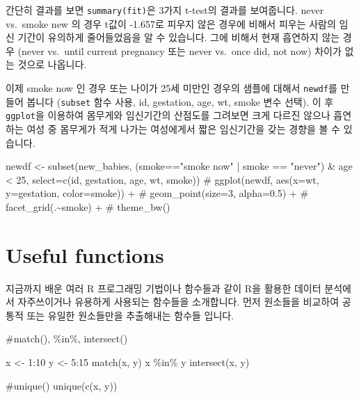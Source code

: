 \documentclass[
  a4paper,
]{book}
\newenvironment{Shaded}{\begin{snugshade}}{\end{snugshade}}
\newcommand{\AttributeTok}[1]{\textcolor[rgb]{0.40,0.45,0.13}{#1}}
\newcommand{\CommentTok}[1]{\textcolor[rgb]{0.37,0.37,0.37}{#1}}
\newcommand{\DecValTok}[1]{\textcolor[rgb]{0.68,0.00,0.00}{#1}}
\newcommand{\FunctionTok}[1]{\textcolor[rgb]{0.28,0.35,0.67}{#1}}
\newcommand{\NormalTok}[1]{\textcolor[rgb]{0.00,0.23,0.31}{#1}}
\newcommand{\OtherTok}[1]{\textcolor[rgb]{0.00,0.23,0.31}{#1}}
\newcommand{\SpecialCharTok}[1]{\textcolor[rgb]{0.37,0.37,0.37}{#1}}
\newcommand{\StringTok}[1]{\textcolor[rgb]{0.13,0.47,0.30}{#1}}
\begin{document}
간단히 결과를 보면 \texttt{summary(fit)}은 3가지 t-test의 결과를
보여줍니다. never vs.~smoke new 의 경우 t값이 -1.657로 피우지 않은
경우에 비해서 피우는 사람의 임신 기간이 유의하게 줄어들었음을 알 수
있습니다. 그에 비해서 현재 흡연하지 않는 경우 (never vs.~until current
pregnancy 또는 never vs.~once did, not now) 차이가 없는 것으로 나옵니다.

이제 smoke now 인 경우 또는 나이가 25세 미만인 경우의 샘플에 대해서
\texttt{newdf}를 만들어 봅니다 (\texttt{subset} 함수 사용, id,
gestation, age, wt, smoke 변수 선택). 이 후 \texttt{ggplot}을 이용하여
몸무게와 임신기간의 산점도를 그려보면 크게 다르진 않으나 흡연하는 여성
중 몸무게가 적게 나가는 여성에게서 짧은 임신기간을 갖는 경향을 볼 수
있습니다.

\begin{Shaded}
\begin{Highlighting}[]
\NormalTok{newdf }\OtherTok{\textless{}{-}} \FunctionTok{subset}\NormalTok{(new\_babies, (smoke}\SpecialCharTok{==}\StringTok{"smoke now"} \SpecialCharTok{|}\NormalTok{ smoke }\SpecialCharTok{==} \StringTok{"never"}\NormalTok{) }\SpecialCharTok{\&}\NormalTok{ age }\SpecialCharTok{\textless{}} \DecValTok{25}\NormalTok{, }\AttributeTok{select=}\FunctionTok{c}\NormalTok{(id, gestation, age, wt, smoke))}
\CommentTok{\# ggplot(newdf, aes(x=wt, y=gestation, color=smoke)) +}
\CommentTok{\#   geom\_point(size=3, alpha=0.5) +}
\CommentTok{\#   facet\_grid(.\textasciitilde{}smoke) + }
\CommentTok{\#   theme\_bw()}
\end{Highlighting}
\end{Shaded}

\hypertarget{useful-functions-1}{%
\section{Useful functions}\label{useful-functions-1}}

지금까지 배운 여러 R 프로그래밍 기법이나 함수들과 같이 R을 활용한 데이터
분석에서 자주쓰이거나 유용하게 사용되는 함수들을 소개합니다. 먼저
원소들을 비교하여 공통적 또는 유일한 원소들만을 추출해내는 함수들
입니다.

\begin{Shaded}
\begin{Highlighting}[]
\CommentTok{\#match(), \%in\%, intersect()}

\NormalTok{x }\OtherTok{\textless{}{-}} \DecValTok{1}\SpecialCharTok{:}\DecValTok{10}
\NormalTok{y }\OtherTok{\textless{}{-}} \DecValTok{5}\SpecialCharTok{:}\DecValTok{15}
\FunctionTok{match}\NormalTok{(x, y)}
\NormalTok{x }\SpecialCharTok{\%in\%}\NormalTok{ y}
\FunctionTok{intersect}\NormalTok{(x, y)}

\CommentTok{\#unique()}
\FunctionTok{unique}\NormalTok{(}\FunctionTok{c}\NormalTok{(x, y))}
\end{Highlighting}
\end{Shaded}
\end{document}
